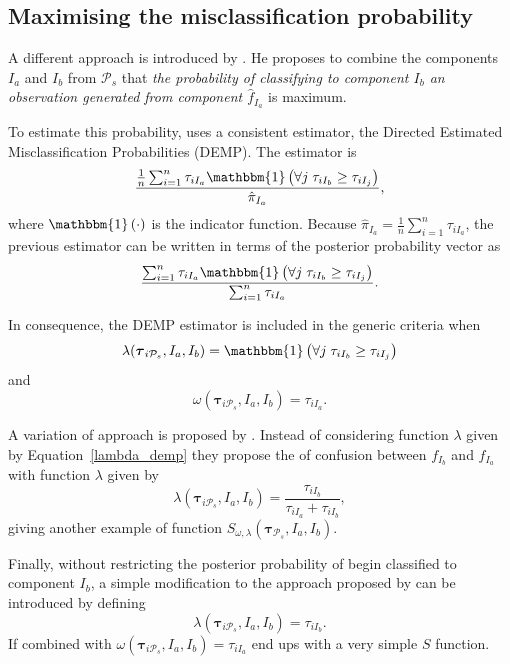\documentclass[submit]{smj}
\theoremstyle{definition}
\newcommand{\m}[1]{\boldsymbol{#1}}
\begin{document}
\subsection{Maximising the misclassification probability}
\label{missclassification_section}

A different approach is introduced by \cite{hennig2010methods}. He proposes to combine the components $I_a$ and $I_b$ from $ \mathcal{P}_s$ that \emph{the probability of classifying to component $I_b$ an observation generated from component $\hat{f}_{I_a}$ } is maximum.

To estimate this probability,  \cite{hennig2010methods} uses a consistent estimator, the Directed Estimated Misclassification Probabilities (DEMP). The estimator is
\[
\frac{ \frac{1}{n} \sum_{i=1}^n {\tau_{iI_a} \mathbbm{1}\left( \forall j\; \tau_{i I_{b}} \geq \tau_{iI_j} \right)}}{ \hat{\pi}_{I_a}},
\]
where $\mathbbm{1}\left( \cdot \right)$ is the indicator function. Because $ \hat{\pi}_{I_a} = \frac{1}{n} \sum_{i=1}^n \tau_{iI_a}$, the previous estimator can be written in terms of the posterior probability vector as
\begin{equation}\label{demp_criteria}
\frac{ \sum_{i=1}^n {\tau_{iI_a} \mathbbm{1}\left( \forall j\; \tau_{i I_{b}} \geq \tau_{iI_j} \right)}}{\sum_{i=1}^n \tau_{iI_a} }.
\end{equation}

In consequence, the DEMP estimator is included in the generic criteria when
\begin{equation}\label{lambda_demp}
\lambda(\m\tau_{i \mathcal{P}_s},  I_a,  I_b) = \mathbbm{1}\left( \forall j\; \tau_{i I_{b}} \geq \tau_{iI_j} \right)
\end{equation}
and
\[
\omega(\m\tau_{i \mathcal{P}_s},  I_a,  I_b) =  \tau_{iI_a}.
\]

A variation of \cite{hennig2010methods} approach is proposed by \cite{longford2014}. Instead of considering function $\lambda$ given by Equation~\ref{lambda_demp} they propose the of confusion between $f_{I_b}$ and $f_{I_a}$ with function $\lambda$ given by
\[
\lambda(\m\tau_{i \mathcal{P}_s},  I_a,  I_b) = \frac{\tau_{iI_b}}{\tau_{iI_a} + \tau_{iI_b}},
\]
giving another example of function $S_{\omega, \lambda}( \m\tau_{\mathcal{P}_s},  I_a,  I_b)$.

Finally, without restricting  the posterior probability of begin classified to component $I_b$, a simple modification to the approach proposed by \cite{longford2014} can be introduced by defining
\[
\lambda(\m\tau_{i \mathcal{P}_s},  I_a,  I_b) = \tau_{iI_b}.
\]
If combined with $\omega(\m\tau_{i \mathcal{P}_s},  I_a,  I_b) =  \tau_{iI_a}$ end ups with a very simple $S$ function.
\end{document}
